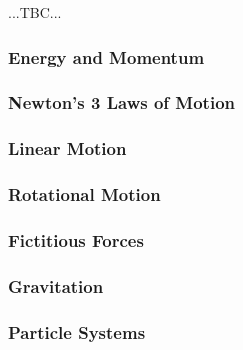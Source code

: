 ...TBC...

\subsubsection{Energy and Momentum}


\subsubsection{Newton's 3 Laws of Motion}

\subsubsection{Linear Motion}

\subsubsection{Rotational Motion}

\subsubsection{Fictitious Forces}

\subsubsection{Gravitation}


\subsubsection{Particle Systems}



